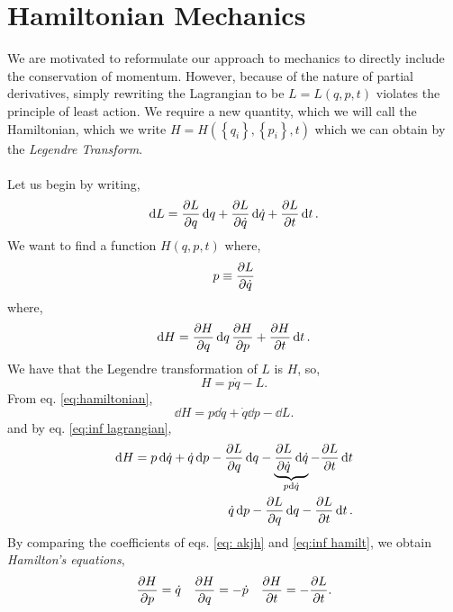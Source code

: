 \documentclass{book}
\begin{document}
\chapter{Hamiltonian Mechanics}
We are motivated to reformulate our approach to mechanics to directly include the conservation of momentum. However, because of the nature of partial derivatives, simply rewriting the Lagrangian to be $L = L(q, p, t)$ violates the principle of least action. We require a new quantity, which we will call the Hamiltonian, which we write $H = H(\left\{q_i\right\},\left\{p_i\right\}, t)$ which we can obtain by the \textit{Legendre Transform}.
\\\\
Let us begin by writing,
\begin{equation}
	\dd{L} = \pdv{L}{q}\dd{q} + \pdv{L}{\dot{q}}\dd{\Dot{q}} + \pdv{L}{t}\dd{t}. \label{eq:inf lagrangian}
\end{equation}
We want to find a function $H(q, p, t)$ where,
\begin{equation}
	p \equiv \pdv{L}{\dot{q}}
\end{equation}
where,
\begin{equation}
	\dd{H} = \pdv{H}{q}\dd{q} \pdv{H}{p} + \pdv{H}{t}\dd{t} . \label{eq: akjh}
\end{equation}
We have that the Legendre transformation of $L$ is $H$, so,
\begin{equation}
	H = p\dot{q} - L. \label{eq:hamiltonian}
\end{equation}
From eq. \eqref{eq:hamiltonian},
\begin{equation}
	\dd{H} = p\dd{\dot{q}} + \dot{q}\dd{p} - \dd{L}.
\end{equation}
and by eq. \eqref{eq:inf lagrangian},
\begin{equation}
	\begin{split}
	\dd{H} = p\dd{\dot{q}} + \Dot{q}\dd{p} - \pdv{L}{q} \dd{q} - \underbrace{\pdv{L}{\Dot{q}}\dd{\Dot{q}}}_{p\dd{\dot{q}}} - \pdv{L}{t}\dd{t} \\
	\Dot{q}\dd{p} - \pdv{L}{q}\dd{q} - \pdv{L}{t}\dd{t}. \label{eq:inf hamilt}
	\end{split}
\end{equation}
By comparing the coefficients of eqs. \eqref{eq: akjh} and \eqref{eq:inf hamilt}, we obtain \textit{Hamilton's equations},
\begin{align}
	\pdv{H}{p} = \Dot{q} && \pdv{H}{q} = -\dot{p} && \pdv{H}{t} = -\pdv{L}{t}. \\
\end{align}
\end{document}
